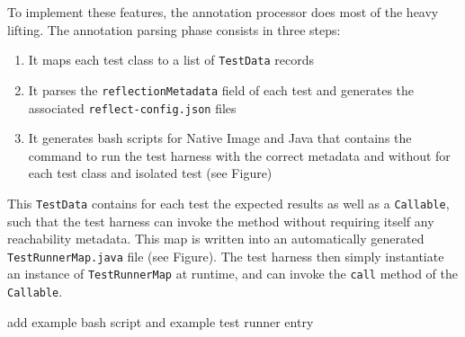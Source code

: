 To implement these features, the annotation processor does most of the heavy lifting. The annotation parsing phase consists in three steps:
\begin{enumerate}
    \item It maps each test class to a list of \verb|TestData| records 
    \item It parses the \verb|reflectionMetadata| field of each test and generates the associated \verb|reflect-config.json| files
    \item It generates bash scripts for Native Image and Java that contains the command to run the test harness with the correct metadata and without for each test class and isolated test (see Figure)
\end{enumerate}

This \verb|TestData| contains for each test the expected results as well as a \verb|Callable|, such that the test harness can invoke the method without requiring itself any reachability metadata. This map is written into an automatically generated \verb|TestRunnerMap.java| file (see Figure).
The test harness then simply instantiate an instance of \verb|TestRunnerMap| at runtime, and can invoke the \verb|call| method of the \verb|Callable|.

add example bash script and example test runner entry


